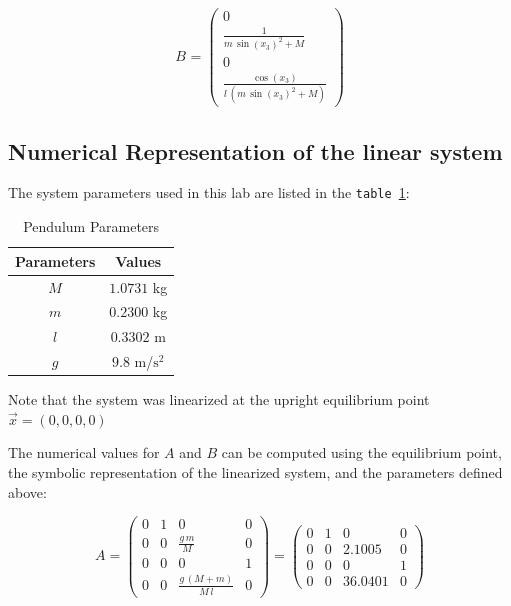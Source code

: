 \documentclass[10pt]{article}
\begin{document}
\begin{equation*}
    B_\text{} = 
    \left(\begin{array}{c} 0\\ \frac{1}{m\,{\sin\left(x_{3}\right)}^2+M}\\ 0\\ \frac{\cos\left(x_{3}\right)}{l\,\left(m\,{\sin\left(x_{3}\right)}^2+M\right)} \end{array}\right)
\end{equation*}

\subsection{Numerical Representation of the linear system}
The system parameters used in this lab are listed in the \texttt{table \ref{tab:sys_param}}:
\begin{table}[hbt!]
    \centering
    \begin{tabular}{c|c}
    \textbf{Parameters} & \textbf{Values} \\
    \hline
         $M$ & $1.0731$ kg \\
         $m$ & $0.2300$ kg \\
         $l$ & $0.3302$ m \\
         $g$ & $9.8$ m/$\text{s}^2$
    \end{tabular}
    \caption{Pendulum Parameters}
    \label{tab:sys_param}
\end{table}

Note that the system was linearized at the upright equilibrium point $\vec{x} = (0, 0, 0, 0)$

The numerical values for $A$ and $B$ can be computed using the equilibrium point, the symbolic representation of the linearized system, and the parameters defined above:

\begin{equation*}
    A = \left(\begin{array}{cccc} 0 & 1 & 0 & 0\\ 0 & 0 & \frac{g\,m}{M} & 0\\ 0 & 0 & 0 & 1\\ 0 & 0 & \frac{g\,\left(M+m\right)}{M\,l} & 0 \end{array}\right) = \left(\begin{array}{cccc} 0 & 1 & 0 & 0\\ 0 & 0 & 2.1005 & 0\\ 0 & 0 & 0 & 1\\ 0 & 0 & 36.0401 & 0 \end{array}\right)
\end{equation*}
\end{document}
